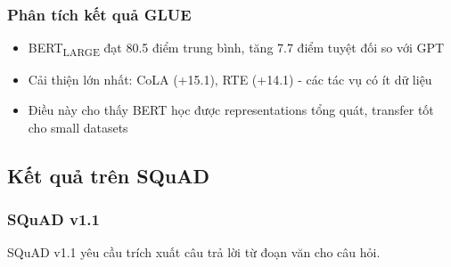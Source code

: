 \begin{table}[H]
    \centering
    \caption{Kết quả BERT trên GLUE test set. Điểm số cao nhất được in đậm.}
    \label{tab:glue_results_detailed}
\end{table}

\subsubsection{Phân tích kết quả GLUE}
\begin{itemize}
    \item BERT\textsubscript{LARGE} đạt 80.5 điểm trung bình, tăng 7.7 điểm tuyệt đối so với GPT
    \item Cải thiện lớn nhất: CoLA (+15.1), RTE (+14.1) - các tác vụ có ít dữ liệu
    \item Điều này cho thấy BERT học được representations tổng quát, transfer tốt cho small datasets
\end{itemize}

\subsection{Kết quả trên SQuAD}
\label{ssec:ket_qua_squad}

\subsubsection{SQuAD v1.1}
SQuAD v1.1 yêu cầu trích xuất câu trả lời từ đoạn văn cho câu hỏi.

